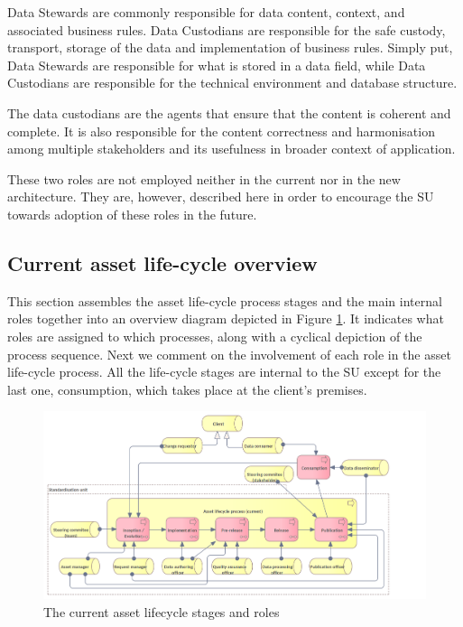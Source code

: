      Data Stewards are commonly responsible for data content, context, and associated business rules. Data Custodians are responsible for the safe custody, transport, storage of the data and implementation of business rules. Simply put, Data Stewards are responsible for what is stored in a data field, while Data Custodians are responsible for the technical environment and database structure.
     
     The data custodians are the agents that ensure that the content is coherent and complete. It is also responsible for the content correctness and harmonisation among multiple stakeholders and its usefulness in broader context of application.	
     
     These two roles are not employed neither in the current nor in the new architecture. They are, however, described here in order to encourage the SU towards adoption of these roles in the future. 

	\subsection{Current asset life-cycle overview}
	\label{sec:lifecycle-current}
	
	This section assembles the asset life-cycle process stages and the main internal roles together into an overview diagram depicted in Figure \ref{fig:lifecycle-current}. It indicates what roles are assigned to which processes, along with a cyclical depiction of the process sequence. Next we comment on the involvement of each role in the asset life-cycle process. All the life-cycle stages are internal to the SU except for the last one, consumption, which takes place at the client's premises.
	
	\begin{figure}[h]
		\centering
		\includegraphics[width=1.05\textwidth]{images/business/Lifecycle (current).png}
		\caption{The current asset lifecycle stages and roles}
		\label{fig:lifecycle-current}
	\end{figure} 
	
